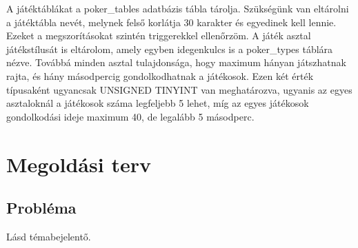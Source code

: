 A játéktáblákat a poker\_tables adatbázis tábla tárolja. Szükségünk van eltárolni a játéktábla nevét, melynek felső korlátja 30 karakter és egyedinek kell lennie. Ezeket a megszorításokat szintén triggerekkel ellenőrzöm. A játék asztal játékstílusát is eltárolom, amely egyben idegenkulcs is a poker\_types táblára nézve. Továbbá minden asztal tulajdonsága, hogy maximum hányan játszhatnak rajta, és hány másodpercig gondolkodhatnak a játékosok. Ezen két érték típusaként ugyancsak UNSIGNED TINYINT van meghatározva, ugyanis az egyes asztaloknál a játékosok száma legfeljebb 5 lehet, míg az egyes játékosok gondolkodási ideje maximum 40, de legalább 5 másodperc.

\section{Megoldási terv}
\subsection{Probléma}
Lásd témabejelentő.

